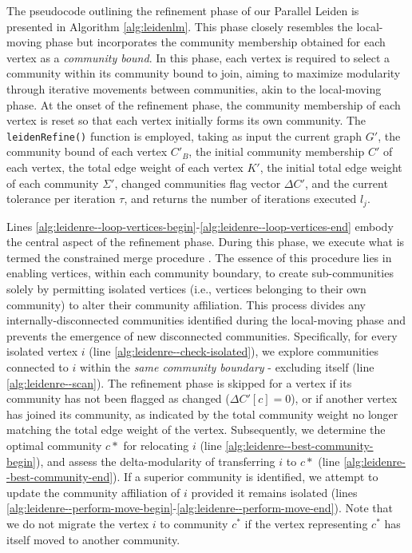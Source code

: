 The pseudocode outlining the refinement phase of our Parallel Leiden is presented in Algorithm \ref{alg:leidenlm}. This phase closely resembles the local-moving phase but incorporates the community membership obtained for each vertex as a \textit{community bound}. In this phase, each vertex is required to select a community within its community bound to join, aiming to maximize modularity through iterative movements between communities, akin to the local-moving phase. At the onset of the refinement phase, the community membership of each vertex is reset so that each vertex initially forms its own community. The \texttt{leidenRefine()} function is employed, taking as input the current graph $G'$, the community bound of each vertex $C'_B$, the initial community membership $C'$ of each vertex, the total edge weight of each vertex $K'$, the initial total edge weight of each community $\Sigma'$, changed communities flag vector $\Delta C'$, and the current tolerance per iteration $\tau$, and returns the number of iterations executed $l_j$.

Lines \ref{alg:leidenre--loop-vertices-begin}-\ref{alg:leidenre--loop-vertices-end} embody the central aspect of the refinement phase. During this phase, we execute what is termed the constrained merge procedure \cite{com-traag19}. The essence of this procedure lies in enabling vertices, within each community boundary, to create sub-communities solely by permitting isolated vertices (i.e., vertices belonging to their own community) to alter their community affiliation. This process divides any internally-disconnected communities identified during the local-moving phase and prevents the emergence of new disconnected communities. Specifically, for every isolated vertex $i$ (line \ref{alg:leidenre--check-isolated}), we explore communities connected to $i$ within the \textit{same community boundary} - excluding itself (line \ref{alg:leidenre--scan}). The refinement phase is skipped for a vertex if its community has not been flagged as changed ($\Delta C'[c] = 0$), or if another vertex has joined its community, as indicated by the total community weight no longer matching the total edge weight of the vertex. Subsequently, we determine the optimal community $c*$ for relocating $i$ (line \ref{alg:leidenre--best-community-begin}), and assess the delta-modularity of transferring $i$ to $c*$ (line \ref{alg:leidenre--best-community-end}). If a superior community is identified, we attempt to update the community affiliation of $i$ provided it remains isolated (lines \ref{alg:leidenre--perform-move-begin}-\ref{alg:leidenre--perform-move-end}). Note that we do not migrate the vertex $i$ to community $c^*$ if the vertex representing $c^*$ has itself moved to another community.


